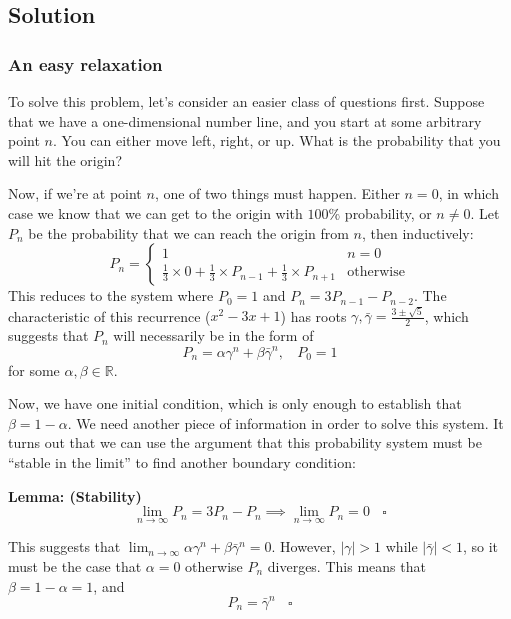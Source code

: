 \subsection*{Solution}

\subsubsection*{An easy relaxation}

To solve this problem, let's consider an easier class of questions first. Suppose that we have a one-dimensional number line, and you start at some arbitrary point $n$. You can either move left, right, or up. What is the probability that you will hit the origin?

Now, if we're at point $n$, one of two things must happen. Either $n = 0$, in which case we know that we can get to the origin with $100\%$ probability, or $n \ne 0$. Let $P_n$ be the probability that we can reach the origin from $n$, then inductively:
$$
P_n = \begin{cases}
1 & n = 0 \\
\frac13 \times 0 + \frac13 \times P_{n-1} + \frac13 \times P_{n+1} & \text{otherwise}
\end{cases}
$$
This reduces to the system where $P_0 = 1$ and $P_n = 3P_{n-1} - P_{n-2}$. The characteristic of this recurrence ($x^2 - 3x + 1$) has roots $\gamma,\bar\gamma = \frac{3 \pm \sqrt5}{2}$, which suggests that $P_n$ will necessarily be in the form of
$$
P_n = \alpha \gamma^n + \beta \bar\gamma^n, ~~~~ P_0 = 1
$$
for some $\alpha, \beta \in \mathbb{R}$.

Now, we have one initial condition, which is only enough to establish that $\beta = 1 - \alpha$. We need another piece of information in order to solve this system. It turns out that we can use the argument that this probability system must be ``stable in the limit'' to find another boundary condition:

\textbf{Lemma: (Stability)}$$
\lim_{n\to\infty} P_n = 3P_n - P_n \implies \lim_{n\to\infty} P_n = 0 ~~~~ \square
$$

This suggests that $\lim_{n\to\infty} \alpha \gamma^n + \beta \bar\gamma^n = 0$. However, $|\gamma| > 1$ while $|\bar\gamma| < 1$, so it must be the case that $\alpha = 0$ otherwise $P_n$ diverges. This means that $\beta = 1 - \alpha = 1$, and
$$
P_n = \bar\gamma^n ~~~~ \square
$$